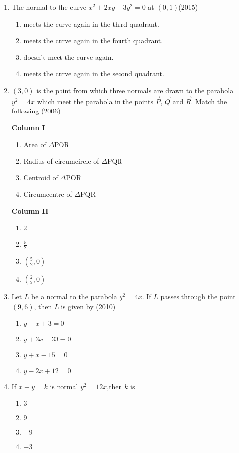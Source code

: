 \begin{enumerate}[label=\thesubsection.\arabic*.,ref=\thesubsection.\theenumi]
\begin{multicols}{4}
\begin{enumerate}
			\item$\sqrt{3}$
		\end{enumerate}
\end{multicols}
\item The normal to the curve $x^2+2xy-3y^2=0$ at $(0,1)$\hfill(2015)
\begin{enumerate}
    \item meets the curve again in the third quadrant.
    \item meets the curve again in the fourth quadrant.
    \item doesn't meet the curve again.
    \item meets the curve again in the second quadrant.
\end{enumerate}
	\item    ${(3,0)}$ is the point from which three normals are drawn to the parabola $y^2 = 4x$ which meet the parabola in the points $\vec{P}$, $\vec{Q}$ and $\vec{R}$. Match the following \hfill{(2006)}
\begin{multicols}{2}
\textbf{Column I}
\begin{enumerate}
    \item Area of $\Delta$POR 
    \item Radius of circumcircle of $\Delta$PQR
    \item Centroid of $\Delta$POR 
    \item  Circumcentre of $\Delta$PQR 
\end{enumerate}

\textbf{Column II}
\begin{enumerate}
    \item 2
    \item $\frac{5}{2}$
    \item ${(\frac{5}{2},0)}$
    \item ${(\frac{2}{3},0)}$
\end{enumerate}
\end{multicols}
%
	\item Let $L$ be a normal to the parabola $y^2=4x$. If $L$ passes through the point $(9,6)$, then $L$ is given by 
		\hfill(2010)
		 \begin{multicols}{4}
\begin{enumerate}
			\item $y-x+3=0$
			\item $y+3x-33=0$
			\item $y+x-15=0$
			\item $y-2x+12=0$
		 \end{enumerate}
\end{multicols}
\item If $x+y=k$ is normal $y^2=12x$,then $k$ is
     \hfill{}
\begin{multicols}{4}
\begin{enumerate}
    \item $3$
    \item $9$
    \item $-9$
    \item $-3$
\end{enumerate}
\end{multicols}


\end{enumerate}
